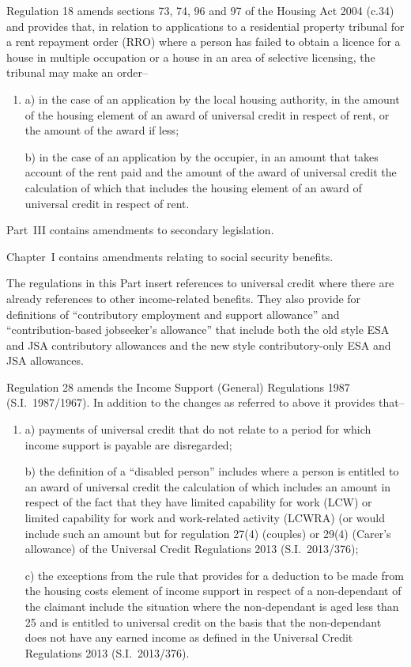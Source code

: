 \documentclass[12pt,a4paper]{article}
\begin{document}
Regulation 18 amends sections 73, 74, 96 and 97 of the Housing Act 2004 (c.34) and provides that, in relation to applications to a residential property tribunal for a rent repayment order (RRO) where a person has failed to obtain a licence for a house in multiple occupation or a house in an area of selective licensing, the tribunal may make an order–
\begin{enumerate}\item[]
a) in the case of an application by the local housing authority, in the amount of the housing element of an award of universal credit in respect of rent, or the amount of the award if less;

b) in the case of an application by the occupier, in an amount that takes account of the rent paid and the amount of the award of universal credit the calculation of which that includes the housing element of an award of universal credit in respect of rent.
\end{enumerate}

Part~III contains amendments to secondary legislation.

Chapter~I contains amendments relating to social security benefits.

The regulations in this Part insert references to universal credit where there are already references to other income-related benefits. They also provide for definitions of “contributory employment and support allowance” and “contribution-based jobseeker’s allowance” that include both the old style ESA and JSA contributory allowances and the new style contributory-only ESA and JSA allowances.

\begin{sloppypar}
Regulation 28 amends the Income Support (General) Regulations 1987 (S.I.~1987\slash 1967). In addition to the changes as referred to above it provides that–
\end{sloppypar}
\begin{enumerate}\item[]
a) payments of universal credit that do not relate to a period for which income support is payable are disregarded;

b) the definition of a “disabled person” includes where a person is entitled to an award of universal credit the calculation of which includes an amount in respect of the fact that they have limited capability for work (LCW) or limited capability for work and work-related activity (LCWRA) (or would include such an amount but for regulation 27(4) (couples) or 29(4) (Carer’s allowance) of the Universal Credit Regulations 2013 (S.I.~2013/376);

c) the exceptions from the rule that provides for a deduction to be made from the housing costs element of income support in respect of a non-dependant of the claimant include the situation where the non-dependant is aged less than 25 and is entitled to universal credit on the basis that the non-dependant does not have any earned income as defined in the Universal Credit Regulations 2013 (S.I.~2013/376).
\end{enumerate}
\end{document}
